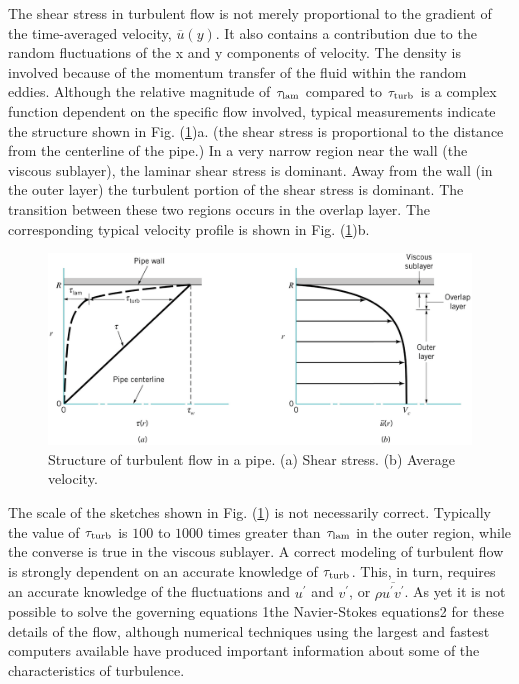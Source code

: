 \documentclass[12pt,a4paper]{article}
\begin{document}
The shear stress in turbulent flow is not merely proportional to the gradient of the time-averaged velocity, $\overline{u}(y)$. It also contains a contribution due to the random fluctuations of the x and y components of velocity. The density is involved because of the momentum transfer of the fluid within the random eddies. Although the relative magnitude of $\tau_{\rm lam}$ compared to $\tau_{\rm turb}$ is a complex function dependent on the specific flow involved, typical measurements indicate the structure shown in Fig. (\ref{fig:turbulent_flow_in_pipe})a. (the shear stress is proportional to the distance from the centerline of the pipe.) In a very narrow region near the wall (the viscous sublayer), the laminar shear stress is dominant. Away from the wall (in the outer layer) the turbulent portion of the shear stress is dominant. The transition between these two regions occurs in the overlap layer. The corresponding typical velocity profile is shown in Fig. (\ref{fig:turbulent_flow_in_pipe})b.


\begin{figure}
\centering
\includegraphics[height=8.cm, angle=0]{turbulent_flow_in_pipe.eps}
\caption{
 Structure of turbulent flow in a pipe. (a) Shear stress. (b) Average velocity.
}
\label{fig:turbulent_flow_in_pipe}
\end{figure}

The scale of the sketches shown in Fig. (\ref{fig:turbulent_flow_in_pipe}) is not necessarily correct. Typically the value of $\tau_{\rm turb}$ is $100$ to $1000$ times greater than $\tau_{\rm lam}$ in the outer region, while the converse is true in the viscous sublayer. A correct modeling of turbulent flow is strongly dependent on an accurate knowledge of $\tau_{\rm turb}$. This, in turn, requires an accurate knowledge of the fluctuations and $u^\prime$ and $v^\prime$, or $\rho \overline{u^\prime v^\prime}$. As yet it is not possible to solve the governing equations 1the Navier-Stokes equations2 for these details of the flow, although numerical techniques  using the largest and fastest computers available have produced important information about some of the characteristics of turbulence.
\end{document}
